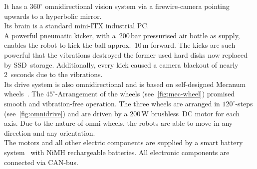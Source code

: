 \documentclass[12pt,a4paper]{article}
\begin{document}
It has a $360^\circ$ omnidirectional vision system via a firewire-camera pointing upwards to a hyperbolic mirror.\\
Its brain is a standard mini-ITX industrial PC.\\
A powerful pneumatic kicker, with a~200\,bar pressurised air bottle as supply, enables the robot to kick the ball approx.\ 10\,m forward.
The kicks are such powerful that the vibrations destroyed the former used hard disks now replaced by SSD~storage.
Additionally, every kick caused a camera blackout of nearly 2~seconds due to the vibrations.\\
Its drive system is also omnidirectional and is based on self-designed Mecanum wheels~\cite{mecanum2007}. 
The $45^\circ$\mbox{-}Arrangement of the wheels (see~\autoref{fig:mec-wheel}) promised smooth and vibration-free operation.
The three wheels are arranged in $120^\circ$\mbox{-}steps (see~\autoref{fig:omnidrive}) and are driven by a 200\,W brushless~DC motor for each axis.
Due to the nature of omni-wheels, the robots are able to move in any direction and any orientation.\\
The motors and all other electric components are supplied by a smart battery system~\cite{krammer06} with NiMH rechargeable batteries.
All electronic components are connected via CAN-bus.
\end{document}
